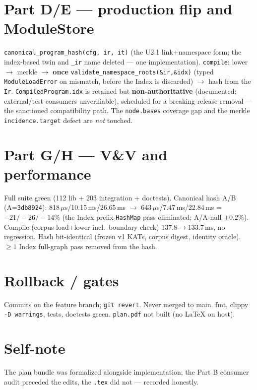 \documentclass[11pt]{article}
\begin{document}
\section*{Part D/E --- production flip and ModuleStore}
\texttt{canonical\_program\_hash(cfg, ir, it)} (the U2.1 link+namespace form; the
index-based twin and \texttt{\_ir} name deleted — one implementation).
\texttt{compile}: lower $\to$ merkle $\to$ \textbf{once} \texttt{validate\_namespace\_roots(\&ir,\&idx)}
(typed \texttt{ModuleLoadError} on mismatch, before the Index is discarded) $\to$
hash from the \texttt{Ir}. \texttt{CompiledProgram.idx} is retained but
\textbf{non-authoritative} (documented; external/test consumers unverifiable),
scheduled for a breaking-release removal --- the sanctioned compatibility path.
The \texttt{node.bases} coverage gap and the merkle \texttt{incidence.target}
defect are \emph{not} touched.

\section*{Part G/H --- V\&V and performance}
Full suite green (112 lib + 203 integration + doctests). Canonical hash A/B
(A=\texttt{3db8924}): 818\,$\mu$s/10.15\,ms/26.65\,ms $\to$ 643\,$\mu$s/7.47\,ms/22.84\,ms
= \textbf{$-21/-26/-14\%$} (the Index prefix-\texttt{HashMap} pass eliminated;
A/A-null $\pm 0.2\%$). Compile (corpus load+lower incl.\ boundary check)
$137.8\to133.7$\,ms, no regression. Hash bit-identical (frozen v1 KATs, corpus
digest, identity oracle). $\geq 1$ Index full-graph pass removed from the hash.

\section*{Rollback / gates}
Commits on the feature branch; \texttt{git revert}. Never merged to main.
fmt, clippy \texttt{-D warnings}, tests, doctests green. \texttt{plan.pdf} not
built (no LaTeX on host).

\section*{Self-note}
The plan bundle was formalized alongside implementation; the Part B consumer
audit preceded the edits, the \texttt{.tex} did not — recorded honestly.
\end{document}
